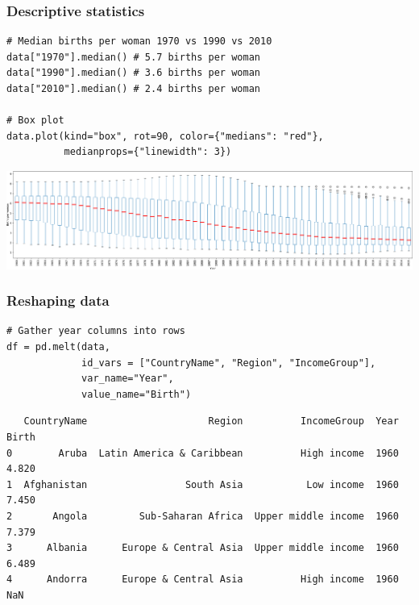 \documentclass[pdf]{beamer}
\begin{document}
\begin{frame}[fragile]
\frametitle{Descriptive statistics}

\begin{lstlisting}[style=python]
# Median births per woman 1970 vs 1990 vs 2010
data["1970"].median() # 5.7 births per woman
data["1990"].median() # 3.6 births per woman 
data["2010"].median() # 2.4 births per woman

# Box plot
data.plot(kind="box", rot=90, color={"medians": "red"}, 
          medianprops={"linewidth": 3})
\end{lstlisting}

\vspace{-0.6cm}
\begin{center}
	\includegraphics[width=1\textwidth]{boxplot.pdf}
\end{center}

\end{frame}

\begin{frame}[fragile]
\frametitle{Reshaping data}

\begin{lstlisting}[style=python]
# Gather year columns into rows
df = pd.melt(data, 
             id_vars = ["CountryName", "Region", "IncomeGroup"], 
             var_name="Year", 
             value_name="Birth")
\end{lstlisting}

{\fontsize{8}{8}\selectfont
\begin{verbatim}
   CountryName                     Region          IncomeGroup  Year  Birth
0        Aruba  Latin America & Caribbean          High income  1960  4.820
1  Afghanistan                 South Asia           Low income  1960  7.450
2       Angola         Sub-Saharan Africa  Upper middle income  1960  7.379
3      Albania      Europe & Central Asia  Upper middle income  1960  6.489
4      Andorra      Europe & Central Asia          High income  1960    NaN 
\end{verbatim}}

\end{frame}
\end{document}
